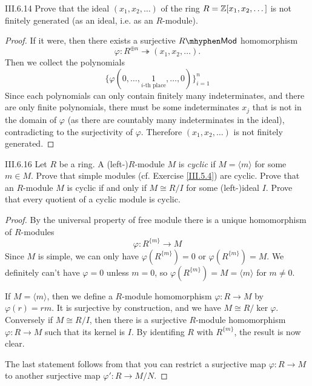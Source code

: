 \begin{problem}{III.6.14}
Prove that the ideal $(x_1,x_2,\dotsc)$ of the ring $R = \mathbb{Z}[x_1,x_2,\dotsc]$ is not finitely generated (as an ideal, i.e. as an $R$-module).
\end{problem}
\begin{proof}
If it were, then there exists a surjective $R\mhyphen\mathsf{Mod}$ homomorphism
\[
\varphi : R^{\oplus n} \twoheadrightarrow (x_1,x_2,\dotsc).
\]
Then we collect the polynomials 
\[
\{\varphi(0,\dotsc,\underset{i\text{-th place}}{1},\dotsc,0)\}_{i = 1}^n	
\]
Since each polynomials can only contain finitely many indeterminates, and there are only finite polynomials, there must be some indeterminates $x_j$ that is not in the domain of $\varphi$ (as there are countably many indeterminates in the ideal), contradicting to the surjectivity of $\varphi$. Therefore $(x_1,x_2,\dotsc)$ is not finitely generated.
\end{proof}

\begin{problem}{III.6.16}
Let $R$ be a ring. A (left-)$R$-module $M$ is \emph{cyclic} if $M = \langle m \rangle$ for some $m \in M$. Prove that simple modules (cf. Exercise \ref{III.5.4}) are cyclic. Prove that an $R$-module $M$ is cyclic if and only if $M \cong R/I$ for some (left-)ideal $I.$ Prove that 
every quotient of a cyclic module is cyclic. 
\end{problem}
\begin{proof}
By the universal property of free module there is a unique homomorphism of $R$-modules
\[
\varphi : R^{\{m\}} \to M	
\]
Since $M$ is simple, we can only have $\varphi(R^{\{m\}}) = 0$ or $\varphi(R^{\{m\}}) = M$. We definitely can't have $\varphi = 0$ unless $m = 0$, so $\varphi(R^{\{m\}}) = M = \langle m \rangle$ for $m \neq 0$. 

If $M = \langle m \rangle$, then we define a $R$-module homomorphism $\varphi: R \to M$ by $\varphi(r) = rm$. It is surjective by construction, and we have $M \cong R/\ker \varphi$.
Conversely if $M \cong R/I$, then there is a surjective $R$-module homomorphism $\varphi: R \to M$ such that its kernel is $I$. By identifing $R$ with $R^{\{m\}}$, the result is now clear.

The last statement follows from that you can restrict a surjective map $\varphi: R \to M$ to another surjective map $\varphi': R \to M/N$. 
\end{proof}

